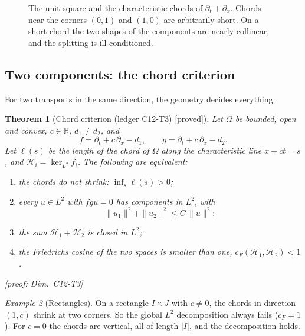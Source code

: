 \documentclass[11pt]{article}
\theoremstyle{plain}
\newtheorem{theorem}{Theorem}[section]
\theoremstyle{definition}
\theoremstyle{remark}
\newtheorem{example}[theorem]{Example}
\newcommand{\R}{\mathbb{R}}
\newcommand{\badge}[2]{\textcolor{#1}{\textsf{\footnotesize[#2]}}}
\newcommand{\proved}[1][]{\badge{cC}{proved#1}}
\newcommand{\led}[1]{\textcolor{cG}{\textsf{\footnotesize(ledger #1)}}}
\newcommand{\dimref}[1]{\textsf{\footnotesize[proof: Dim.~#1]}}
\begin{document}
\begin{figure}[!htb]
\centering
{}
\caption{The unit square and the characteristic chords of $\partial_t+\partial_x$. Chords near the corners $(0,1)$ and $(1,0)$ are arbitrarily short. On a short chord the two shapes of the components are nearly collinear, and the splitting is ill-conditioned.}\label{fig:chords}
\end{figure}

\subsection{Two components: the chord criterion}

For two transports in the same direction, the geometry decides everything.

\begin{theorem}[{Chord criterion \led{C12-T3} \proved}]\label{thm:chord}
Let $\Omega$ be bounded, open and convex, $c\in\R$, $d_1\ne d_2$, and
\[
f=\partial_t+c\,\partial_x-d_1,\qquad g=\partial_t+c\,\partial_x-d_2 .
\]
Let $\ell(s)$ be the length of the chord of $\Omega$ along the characteristic line $x-ct=s$, and $\mathcal H_i=\ker_{L^2}f_i$. The following are equivalent:
\begin{enumerate}[label=(\alph*)]
\item the chords do not shrink: $\inf_s\ell(s)>0$;
\item every $u\in L^2$ with $fgu=0$ has components in $L^2$, with
\[
\|u_1\|^2+\|u_2\|^2\le C\,\|u\|^2 ;
\]
\item the sum $\mathcal H_1+\mathcal H_2$ is closed in $L^2$;
\item the Friedrichs cosine of the two spaces is smaller than one, $c_F(\mathcal H_1,\mathcal H_2)<1$.
\end{enumerate}
\dimref{C12-T3}
\end{theorem}

\begin{example}[{Rectangles}]
On a rectangle $I\times J$ with $c\ne0$, the chords in direction $(1,c)$ shrink at two corners. So the global $L^2$ decomposition always fails ($c_F=1$). For $c=0$ the chords are vertical, all of length $|I|$, and the decomposition holds.
\end{example}
\end{document}
